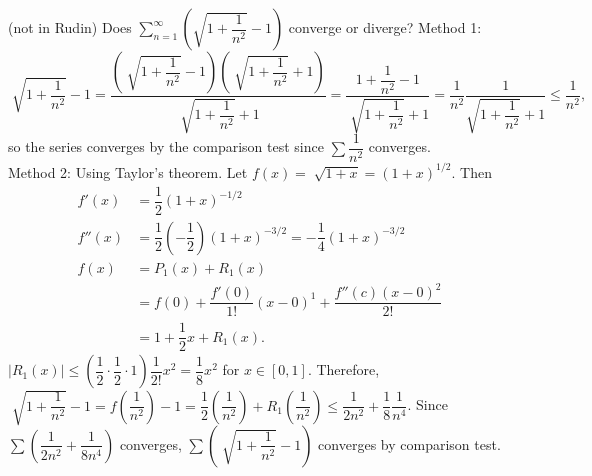 \begin{example}
	(not in Rudin)
	Does $\sum_{n=1}^{\infty}{\left( \sqrt{1+\dfrac{1}{n^2}}-1 \right)}$ converge or diverge?
	Method 1:
	\[
		\sqrt[]{1+\dfrac{1}{n^2}}-1=\dfrac{\left(\sqrt[]{1+\dfrac{1}{n^2}}-1\right)\left(\sqrt[]{1+\dfrac{1}{n^2}}+1\right)}{\sqrt[]{1+\dfrac{1}{n^2}}+1}
		=\dfrac{1+\dfrac{1}{n^2}-1}{\sqrt[]{1+\dfrac{1}{n^2}}+1}=\dfrac{1}{n^2}\dfrac{1}{\sqrt{1+\dfrac{1}{n^2}}+1}\le \dfrac{1}{n^2}
		,\] so the series converges by the comparison test since $\sum{\dfrac{1}{n^2}}$ converges.\\
	Method 2: Using Taylor's theorem. Let $f(x)=\sqrt[]{1+x}=(1+x)^{1/2}$. Then
	\begin{align*}
		f'(x)  & =\dfrac{1}{2}(1+x)^{-1/2}                                            \\
		f''(x) & =\dfrac{1}{2}(-\dfrac{1}{2})(1+x)^{-3/2}  =-\dfrac{1}{4}(1+x)^{-3/2} \\
		f(x)   & =P_1(x)+R_1(x)                                                       \\
		       & =f(0)+\dfrac{f'(0)}{1!}(x-0)^{1}+\dfrac{f''(c)(x-0)^{2}}{2!}         \\
		       & =1+\dfrac{1}{2}x+R_1(x)
		.\end{align*}
	$|R_1(x)|\le (\dfrac{1}{2}\cdot \dfrac{1}{2}\cdot 1)\dfrac{1}{2!}x^{2}=\dfrac{1}{8}x^2$ for $x \in [0,1]$.
	Therefore, $\sqrt[]{1+\dfrac{1}{n^2}}-1=f(\dfrac{1}{n^2})-1=\dfrac{1}{2}(\dfrac{1}{n^2})+R_1(\dfrac{1}{n^2})\le \dfrac{1}{2n^2}+\dfrac{1}{8}\dfrac{1}{n^{4}}$.
	Since $\sum{\left(\dfrac{1}{2n^2} +\dfrac{1}{8n^{4}}\right)}$ converges, $\sum{\left(\sqrt[]{ 1+\dfrac{1}{n^2}}-1 \right)}$  converges by comparison test.
\end{example}

